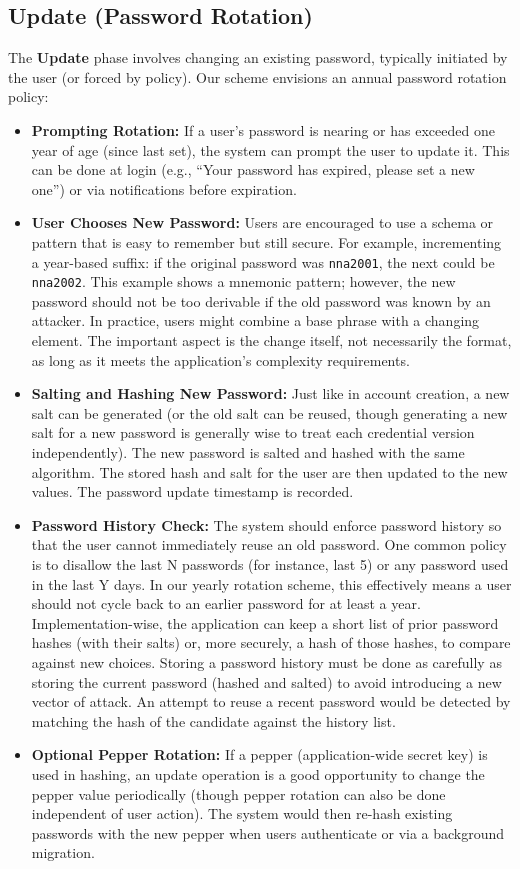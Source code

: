 \documentclass[11pt]{article}
\begin{document}
\subsection{Update (Password Rotation)}
The \textbf{Update} phase involves changing an existing password, typically initiated by the user (or forced by policy). Our scheme envisions an annual password rotation policy:
\begin{itemize}
    \item \textbf{Prompting Rotation:} If a user’s password is nearing or has exceeded one year of age (since last set), the system can prompt the user to update it. This can be done at login (e.g., “Your password has expired, please set a new one”) or via notifications before expiration.
    \item \textbf{User Chooses New Password:} Users are encouraged to use a schema or pattern that is easy to remember but still secure. For example, incrementing a year-based suffix: if the original password was \texttt{nna2001}, the next could be \texttt{nna2002}. This example shows a mnemonic pattern; however, the new password should not be too derivable if the old password was known by an attacker. In practice, users might combine a base phrase with a changing element. The important aspect is the change itself, not necessarily the format, as long as it meets the application's complexity requirements.
    \item \textbf{Salting and Hashing New Password:} Just like in account creation, a new salt can be generated (or the old salt can be reused, though generating a new salt for a new password is generally wise to treat each credential version independently). The new password is salted and hashed with the same algorithm. The stored hash and salt for the user are then updated to the new values. The password update timestamp is recorded.
    \item \textbf{Password History Check:} The system should enforce password history so that the user cannot immediately reuse an old password. One common policy is to disallow the last N passwords (for instance, last 5) or any password used in the last Y days. In our yearly rotation scheme, this effectively means a user should not cycle back to an earlier password for at least a year. Implementation-wise, the application can keep a short list of prior password hashes (with their salts) or, more securely, a hash of those hashes, to compare against new choices. Storing a password history must be done as carefully as storing the current password (hashed and salted) to avoid introducing a new vector of attack. An attempt to reuse a recent password would be detected by matching the hash of the candidate against the history list.
    \item \textbf{Optional Pepper Rotation:} If a pepper (application-wide secret key) is used in hashing, an update operation is a good opportunity to change the pepper value periodically (though pepper rotation can also be done independent of user action). The system would then re-hash existing passwords with the new pepper when users authenticate or via a background migration.
\end{itemize}
\end{document}
